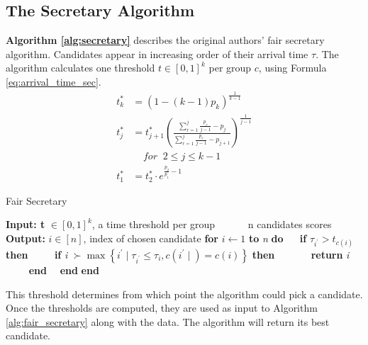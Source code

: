 \subsection{The Secretary Algorithm}

\begin{minipage}{0.46\textwidth}
  \textbf{Algorithm \ref{alg:secretary}} describes the original authors' fair secretary algorithm. Candidates appear in increasing order of their arrival time $\tau$. The algorithm calculates one threshold $t \in [0,1]^k$ per group $c$, using Formula \ref{eq:arrival_time_sec}.
  \begin{equation}
    \label{eq:arrival_time_sec}
    \begin{split}
    t_k^* &= (1 - (k - 1)p_k)^{\frac{1}{k-1}} \\
    t_j^* &= t_{j+1}^* \left( \frac{\sum_{r=1}^j \frac{p_r}{j-1} - p_j}{\sum_{r=1}^j \frac{p_r}{j-1} - p_{j+1}} \right)^{\frac{1}{j-1}} \\
             &\;\;\;\;for\;\;2\leq j \leq k - 1 \\
    t_1^* &= t_2^* \cdot e^{\frac{p_2}{p_1} - 1}
    \end{split}
  \end{equation}
  \end{minipage}
  \hfill
\begin{minipage}{0.50\textwidth}
  \begin{algorithm}[H]
    \caption{Fair Secretary}
    \label{alg:secretary}
    \begin{algorithmic}
    \State \textbf{Input: t} $\in [0,1]^k $, a time threshold per group
    \State $\qquad \>\>\>$ n candidates scores
    \State \textbf{Output: }$i \in [n]$, index of chosen candidate
    \State \textbf{for} $i \leftarrow 1$ \textbf{to} \textit{n} \textbf{do}
    \State $\quad$ \textbf{if} $\tau_{i^{\prime}} > t_{c(i)}$ \textbf{then}
    \State $\qquad$ \textbf{if} \textit{i} $\succ \max \left\{i^{\prime} \mid \tau_{i^{\prime}} \leq \tau_{i}, c\left(i^{\prime} \mid\right)=c(i)\right\}$ \textbf{then}
    \State $\qquad \quad$ \textbf{return} \textit{i}
    \State $\qquad$ \textbf{end}
    \State $\quad$\textbf{end}
    \State \textbf{end}
    \end{algorithmic}
    \label{alg:fair_secretary}
  \end{algorithm}
\end{minipage}
This threshold determines from which point the algorithm could pick a candidate. Once the thresholds are computed, they are used as input to Algorithm \ref{alg:fair_secretary} along with the data. The algorithm will return its best candidate.


